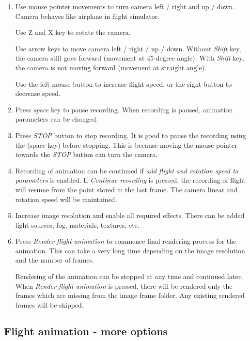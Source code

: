 \begin{enumerate}
	\item Use mouse pointer movements to turn camera left / right and up / down. Camera behaves like airplane in flight simulator.
	
	Use Z and X key to rotate the camera.
	
	Use arrow keys to move camera left / right / up / down. Without \emph{Shift} key, the camera still goes forward (movement at 45-degree angle). With \emph{Shift} key, the camera is not moving forward (movement at straight angle).
	
	Use the left mouse button to increase flight speed, or the right button to decrease speed.
	
	\item Press \emph{space} key to pause recording. When recording is paused, animation parameters can be changed. 
	
	\item Press \emph{STOP} button to stop recording. It is good to pause the recording using the (space key) before stopping. This is because moving the mouse pointer towards the \emph{STOP} button can turn the camera.
	
	\item Recording of animation can be continued if \emph{add flight and rotation speed to parameters} is enabled. If \emph{Continue recording} is pressed, the recording of flight will resume from the point stored in the last frame. The camera linear and rotation speed will be maintained.
	
	\item Increase image resolution and enable all required effects. There can be added light sources, fog, materials, textures, etc.
	
	\item Press \emph{Render flight animation} to commence final rendering  process for the animation. This can take a very long time depending on the image resolution and the number of frames.
	
	Rendering of the animation can be stopped at any time and continued later. When \emph{Render flight animation} is pressed, there will be rendered only the frames which are missing from the image frame folder. Any existing rendered frames will be skipped.
	
\end{enumerate}
	
	\subsection{Flight animation - more options}
	

